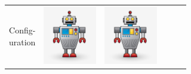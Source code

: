 \documentclass[a4paper, landscape]{article}
\newcommand{\picHeight}{1in}
\begin{document}
        \begin{tabular}{| c | c | c | c | c | c |}
            \hline
            \pbox{20cm}{Config-\\uration} &
            \includegraphics[height=\picHeight]{robot-character.jpg} &
            \includegraphics[height=\picHeight]{robot-character.jpg} &

\end{tabular}
\end{document}
